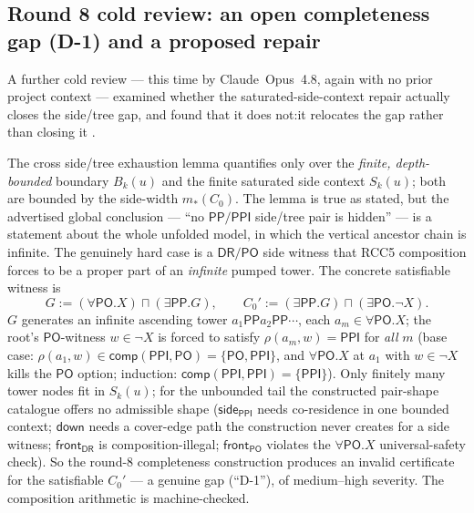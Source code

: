 \documentclass[
]{ceurart}
\theoremstyle{definition}
\newcommand{\DR}{\ensuremath{\mathsf{DR}}}
\newcommand{\PO}{\ensuremath{\mathsf{PO}}}
\newcommand{\PP}{\ensuremath{\mathsf{PP}}}
\newcommand{\PPI}{\ensuremath{\mathsf{PPI}}}
\newcommand{\comp}{\ensuremath{\mathsf{comp}}}
\newcommand{\down}{\ensuremath{\mathsf{down}}}
\newcommand{\side}{\ensuremath{\mathsf{side}}}
\newcommand{\front}{\ensuremath{\mathsf{front}}}
\begin{document}
\subsection{Round 8 cold review: an open completeness gap (D-1) and
a proposed repair}
\label{ssec:round8-review}

A further cold review --- this time by Claude~Opus~4.8, again with
no prior project context --- examined whether the saturated-side-context
repair actually closes the side/tree gap, and found that it does
not:\@ it relocates the gap rather than closing it
\cite{Opus48Round8Review}.

The cross side/tree exhaustion lemma quantifies only over the
\emph{finite, depth-bounded} boundary $B_k(u)$ and the finite
saturated side context $S_k(u)$; both are bounded by the
side-width $m_\ast(C_0)$.  The lemma is true as stated, but the
advertised global conclusion --- ``no $\PP/\PPI$ side/tree pair is
hidden'' --- is a statement about the whole unfolded model, in
which the vertical ancestor chain is infinite.  The genuinely hard
case is a $\DR/\PO$ side witness that RCC5 composition forces to be
a proper part of an \emph{infinite} pumped tower.  The concrete
satisfiable witness is
\[
  G := (\forall\PO.X)\sqcap(\exists\PP.G),\qquad
  C_0' := (\exists\PP.G)\sqcap(\exists\PO.\neg X).
\]
$G$ generates an infinite ascending tower $a_1\PP a_2\PP\cdots$,
each $a_m\in\forall\PO.X$; the root's $\PO$-witness $w\in\neg X$ is
forced to satisfy $\rho(a_m,w)=\PPI$ for \emph{all} $m$ (base case:
$\rho(a_1,w)\in\comp(\PPI,\PO)=\{\PO,\PPI\}$, and $\forall\PO.X$ at
$a_1$ with $w\in\neg X$ kills the $\PO$ option; induction:
$\comp(\PPI,\PPI)=\{\PPI\}$).  Only finitely many tower nodes fit
in $S_k(u)$; for the unbounded tail the constructed pair-shape
catalogue offers no admissible shape ($\side_{\PPI}$ needs
co-residence in one bounded context; $\down$ needs a cover-edge
path the construction never creates for a side witness;
$\front_{\DR}$ is composition-illegal; $\front_{\PO}$ violates the
$\forall\PO.X$ universal-safety check).  So the round-8 completeness
construction produces an invalid certificate for the satisfiable
$C_0'$ --- a genuine gap (``D-1''), of medium--high severity.  The
composition arithmetic is machine-checked.
\end{document}
